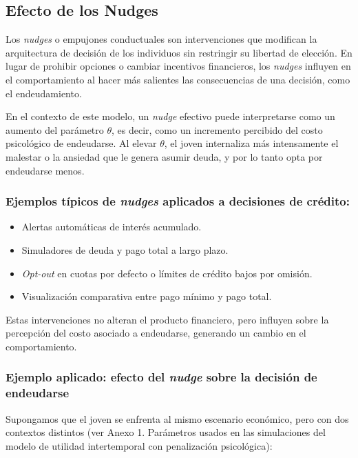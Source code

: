\documentclass[10pt]{article}
\begin{document}
\begin{multicols}{2}
\subsection{Efecto de los Nudges}

Los \textit{nudges} o empujones conductuales son intervenciones que modifican la arquitectura de decisión de los individuos sin restringir su libertad de elección. En lugar de prohibir opciones o cambiar incentivos financieros, los \textit{nudges} influyen en el comportamiento al hacer más salientes las consecuencias de una decisión, como el endeudamiento.

En el contexto de este modelo, un \textit{nudge} efectivo puede interpretarse como un aumento del parámetro $\theta$, es decir, como un incremento percibido del costo psicológico de endeudarse. Al elevar $\theta$, el joven internaliza más intensamente el malestar o la ansiedad que le genera asumir deuda, y por lo tanto opta por endeudarse menos.

\subsubsection*{Ejemplos típicos de \textit{nudges} aplicados a decisiones de crédito:}
\begin{itemize}
    \item Alertas automáticas de interés acumulado.
    \item Simuladores de deuda y pago total a largo plazo.
    \item \textit{Opt-out} en cuotas por defecto o límites de crédito bajos por omisión.
    \item Visualización comparativa entre pago mínimo y pago total.
\end{itemize}

Estas intervenciones no alteran el producto financiero, pero influyen sobre la percepción del costo asociado a endeudarse, generando un cambio en el comportamiento.

\subsubsection*{Ejemplo aplicado: efecto del \textit{nudge} sobre la decisión de endeudarse}

Supongamos que el joven se enfrenta al mismo escenario económico, pero con dos contextos distintos (ver Anexo 1. Parámetros usados en las simulaciones del modelo de utilidad intertemporal con penalización psicológica):


\end{multicols}
\end{document}
